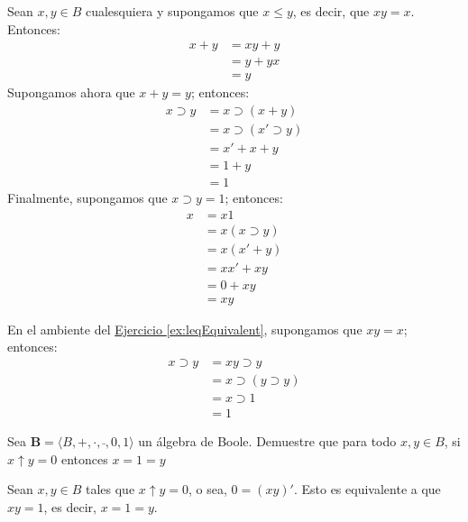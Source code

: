 \begin{solution}
  Sean $x,y\in B$ cualesquiera y supongamos que $x\leq y$, es decir,
  que $xy=x$. Entonces:
  \begin{align*}
    x+y&=xy+y\\
       &=y+yx\\
       &=y
  \end{align*}
Supongamos ahora que $x+y=y$; entonces:
\begin{align*}
  x\supset y&=x\supset(x+y)\\
        &=x\supset(x'\supset y)\\
        &=x'+x+y\\
        &=1+y\\
        &=1
\end{align*}
Finalmente, supongamos que $x\supset y=1$; entonces:
\begin{align*}
  x&=x1\\
   &=x(x\supset y)\\
   &=x(x'+y)\\
   &=xx'+xy\\
   &=0+xy\\
   &=xy
\end{align*}
\end{solution}

\begin{remark}
  En el ambiente del \hyperref[ex:leqEquivalent]{Ejercicio
    \ref*{ex:leqEquivalent}}, supongamos que $xy=x$; entonces:
  \begin{align*}
    x\supset y&=xy\supset y\\
          &=x\supset(y\supset y)\\
          &=x\supset 1\\
          &=1
  \end{align*}
\end{remark}

\begin{exercise}
  \label{ex:nandConsequence}
  Sea $\mathbf{B}=\langle B,+,\cdot,\bar{\ },0,1\rangle$ un álgebra de
  Boole. Demuestre que para todo $x,y\in B$, si $x\uparrow y=0$
  entonces $x=1=y$ 
\end{exercise}

\begin{solution}
  Sean $x,y\in B$ tales que $x\uparrow y=0$, o sea, $0=(xy)'$. Esto es
  equivalente a que $xy=1$, es decir, $x=1=y$.
\end{solution}


